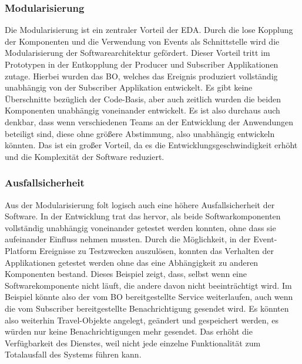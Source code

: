 \subsubsection*{Modularisierung}
Die Modularisierung ist ein zentraler Vorteil der \ac{EDA}. Durch die lose Kopplung der Komponenten und die Verwendung von Events als Schnittstelle wird die Modularisierung der Softwarearchitektur gefördert. Dieser Vorteil tritt im Prototypen in der Entkopplung der Producer und Subscriber Applikationen zutage. Hierbei wurden das \ac{BO}, welches das Ereignis produziert vollständig unabhängig von der Subscriber Applikation entwickelt. Es gibt keine Überschnitte bezüglich der Code-Basis, aber auch zeitlich wurden die beiden Komponenten unabhängig voneinander entwickelt. Es ist also durchaus auch denkbar, dass wenn verschiedenen Teams an der Entwicklung der Anwendungen beteiligt sind, diese ohne größere Abstimmung, also unabhängig entwickeln könnten. Das ist ein großer Vorteil, da es die Entwicklungsgeschwindigkeit erhöht und die Komplexität der Software reduziert.
\subsubsection*{Ausfallsicherheit}
Aus der Modularisierung folt logisch auch eine höhere Ausfallsicherheit der Software. In der Entwicklung trat das hervor, als beide Softwarkomponenten vollständig unabhängig voneinander getestet werden konnten, ohne dass sie aufeinander Einfluss nehmen mussten. Durch die Möglichkeit, in der Event-Platform Ereignisse zu Testzwecken auszulösen, konnten das Verhalten der Applikationen getestet werden ohne das eine Abhängigkeit zu anderen Komponenten bestand. Dieses Beispiel zeigt, dass, selbst wenn eine Softwarekomponente nicht läuft, die andere davon nicht beeinträchtigt wird. Im Beispiel könnte also der vom \ac{BO} bereitgestellte Service weiterlaufen, auch wenn die vom Subscriber bereitgestellte Benachrichtigung gesendet wird. Es könnten also weiterhin Travel-Objekte angelegt, geändert und gespeichert werden, es würden nur keine Benachrichtigungen mehr gesendet. Das erhöht die Verfügbarkeit des Dienstes, weil nicht jede einzelne Funktionalität zum Totalausfall des Systems führen kann.
